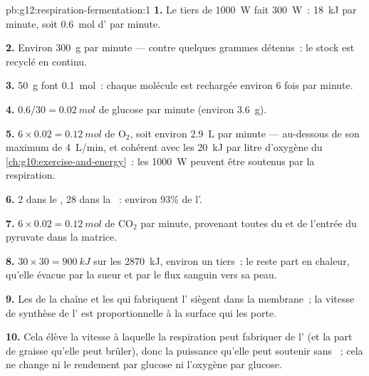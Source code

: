 \begin{solution}{pb:g12:respiration-fermentation:1}
\textbf{1.} Le tiers de \qty{1000}{W} fait \qty{300}{W}~:
\qty{18}{kJ} par minute, soit \qty{0.6}{mol} d' par minute.

\textbf{2.} Environ \qty{300}{g} par minute --- contre quelques
grammes détenus~: le stock est recyclé en continu.

\textbf{3.} \qty{50}{g} font \qty{0.1}{mol}~: chaque molécule est
rechargée environ 6 fois par minute.

\textbf{4.} $0.6/30 = \qty{0.02}{mol}$ de glucose par minute (environ
\qty{3.6}{g}).

\textbf{5.} $6 \times 0.02 = \qty{0.12}{mol}$ de $\mathrm{O_2}$, soit
environ \qty{2.9}{L} par minute --- au-dessous de son maximum de
\qty{4}{L/min}, et cohérent avec les \qty{20}{kJ} par litre d'oxygène
du \cref{ch:g10:exercise-and-energy}~: les \qty{1000}{W} peuvent être
soutenus par la respiration.

\textbf{6.} 2 dans le , 28 dans la ~: environ
93\% de l'.

\textbf{7.} $6 \times 0.02 = \qty{0.12}{mol}$ de $\mathrm{CO_2}$ par
minute, provenant toutes du  et de l'entrée du pyruvate
dans la matrice.

\textbf{8.} $30 \times 30 = \qty{900}{kJ}$ sur les \qty{2870}{kJ},
environ un tiers~; le reste part en chaleur, qu'elle évacue par la
sueur et par le flux sanguin vers sa peau.

\textbf{9.} Les  de la chaîne et les  qui fabriquent
l' siègent dans la membrane~; la vitesse de synthèse de l' est
proportionnelle à la surface qui les porte.

\textbf{10.} Cela élève la vitesse à laquelle la respiration peut
fabriquer de l' (et la part de graisse qu'elle peut brûler), donc
la puissance qu'elle peut soutenir sans ~; cela ne change
ni le rendement par glucose ni l'oxygène par glucose.


\end{solution}
